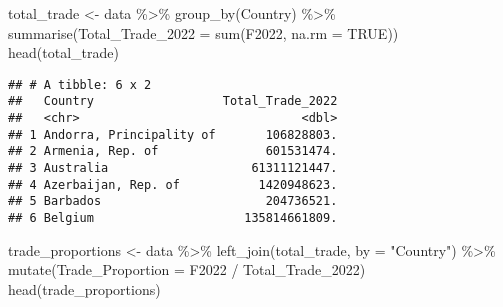 \documentclass[
]{article}
\newenvironment{Shaded}{\begin{snugshade}}{\end{snugshade}}
\newcommand{\AttributeTok}[1]{\textcolor[rgb]{0.77,0.63,0.00}{#1}}
\newcommand{\ConstantTok}[1]{\textcolor[rgb]{0.00,0.00,0.00}{#1}}
\newcommand{\FunctionTok}[1]{\textcolor[rgb]{0.00,0.00,0.00}{#1}}
\newcommand{\NormalTok}[1]{#1}
\newcommand{\OtherTok}[1]{\textcolor[rgb]{0.56,0.35,0.01}{#1}}
\newcommand{\SpecialCharTok}[1]{\textcolor[rgb]{0.00,0.00,0.00}{#1}}
\newcommand{\StringTok}[1]{\textcolor[rgb]{0.31,0.60,0.02}{#1}}
\begin{document}
\begin{Shaded}
\begin{Highlighting}[]
\NormalTok{total\_trade }\OtherTok{\textless{}{-}}\NormalTok{ data }\SpecialCharTok{\%\textgreater{}\%}
  \FunctionTok{group\_by}\NormalTok{(Country) }\SpecialCharTok{\%\textgreater{}\%}
  \FunctionTok{summarise}\NormalTok{(}\AttributeTok{Total\_Trade\_2022 =} \FunctionTok{sum}\NormalTok{(F2022, }\AttributeTok{na.rm =} \ConstantTok{TRUE}\NormalTok{))}
\FunctionTok{head}\NormalTok{(total\_trade)}
\end{Highlighting}
\end{Shaded}

\begin{verbatim}
## # A tibble: 6 x 2
##   Country                  Total_Trade_2022
##   <chr>                               <dbl>
## 1 Andorra, Principality of       106828803.
## 2 Armenia, Rep. of               601531474.
## 3 Australia                    61311121447.
## 4 Azerbaijan, Rep. of           1420948623.
## 5 Barbados                       204736521.
## 6 Belgium                     135814661809.
\end{verbatim}

\begin{Shaded}
\begin{Highlighting}[]
\NormalTok{trade\_proportions }\OtherTok{\textless{}{-}}\NormalTok{ data }\SpecialCharTok{\%\textgreater{}\%}
  \FunctionTok{left\_join}\NormalTok{(total\_trade, }\AttributeTok{by =} \StringTok{"Country"}\NormalTok{) }\SpecialCharTok{\%\textgreater{}\%}
  \FunctionTok{mutate}\NormalTok{(}\AttributeTok{Trade\_Proportion =}\NormalTok{ F2022 }\SpecialCharTok{/}\NormalTok{ Total\_Trade\_2022)}
\FunctionTok{head}\NormalTok{(trade\_proportions)}
\end{Highlighting}
\end{Shaded}
\end{document}
